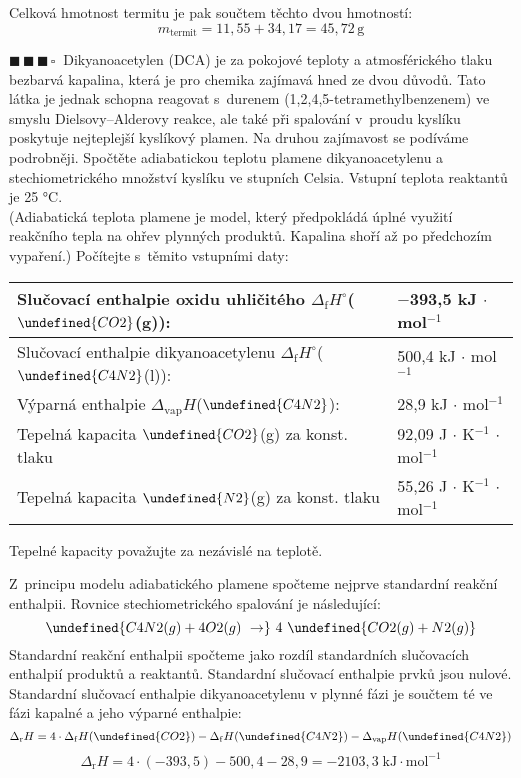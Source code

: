 \documentclass{book}
\let\ch\undefined
\newcommand{\tri}{$\blacksquare \, \blacksquare \, \blacksquare \, \square \; \; $}
\renewenvironment{quotation}{\par}{\par} %
\begin{document}
Celková hmotnost termitu je pak součtem těchto dvou hmotností:
\[
m_{\mathrm{termit}}=11,55+34,17=45,72\,\mathrm{g}
\]
\hrulefill %
\begin{quotation}
\tri Dikyanoacetylen (DCA) je za pokojové teploty a atmosférického tlaku
bezbarvá kapalina, která je pro chemika zajímavá hned ze dvou důvodů.
Tato látka je jednak schopna reagovat s~durenem (1,2,4,5-tetramethylbenzenem)
ve smyslu Dielsovy--Alderovy reakce, ale také při spalování v~proudu
kyslíku poskytuje nejteplejší kyslíkový plamen. Na druhou zajímavost
se podíváme podrobněji. Spočtěte adiabatickou teplotu plamene dikyanoacetylenu
a stechiometrického množství kyslíku ve stupních Celsia. Vstupní teplota
reaktantů je 25 °C.\\
(Adiabatická teplota plamene je model, který předpokládá
úplné využití reakčního tepla na ohřev plynných produktů. Kapalina
shoří až po předchozím vypaření.) Počítejte s~těmito vstupními daty:
\vspace{0,5cm}

\begin{tabular}{l|l}
Slučovací enthalpie oxidu uhličitého $\Delta_{\mathrm{f}}H^{\circ}$($\ch{CO2}$(g)): & $-$393,5 kJ $\cdot$ mol$^{-1}$\tabularnewline
\hline
Slučovací enthalpie dikyanoacetylenu $\Delta_{\mathrm{f}}H^{\circ}$($\ch{C4N2}$(l)): & 500,4 kJ $\cdot$ mol$^{-1}$\tabularnewline \hline
Výparná enthalpie $\Delta_{\mathrm{vap}}H$($\ch{C4N2}$): & 28,9 kJ $\cdot$ mol$^{-1}$\tabularnewline \hline
Tepelná kapacita $\ch{CO2}$(g) za konst. tlaku & 92,09 J $\cdot$ K$^{-1}$ $\cdot$ mol$^{-1}$ \tabularnewline \hline
Tepelná kapacita $\ch{N2}$(g) za konst. tlaku & 55,26 J $\cdot$ K$^{-1}$ $\cdot$ mol$^{-1}$\tabularnewline 
\end{tabular}
\vspace{0,5cm}

\noindent\-Tepelné kapacity považujte za nezávislé na teplotě.
\end{quotation} \dotfill \par 
Z~principu modelu adiabatického plamene spočteme nejprve standardní
reakční enthalpii. Rovnice stechiometrického spalování je následující:
\[
\ch{C4N2 (g) + 4 O2 (g)\ \rightarrow}\ 4\ \ch{CO2 (g) + N2 (g)}
\]
Standardní reakční enthalpii spočteme jako rozdíl standardních slučovacích
enthalpií produktů a reaktantů. Standardní slučovací enthalpie prvků
jsou nulové. Standardní slučovací enthalpie dikyanoacetylenu
v plynné fázi je součtem té ve fázi kapalné a jeho výparné enthalpie:
\[
\Delta_{\mathrm{r}}H=4\cdot\Delta_{\mathrm{f}}H(\ch{CO2})-\Delta_{\mathrm{f}}H(\ch{C4N2})-\Delta_{\mathrm{vap}}H(\ch{C4N2})
\]
\[
\Delta_{\mathrm{r}}H=4\cdot (-393,5) - 500,4 - 28,9 =-2103,3\;\mathrm{kJ\cdot mol^{-1}}
\]
\end{document}
